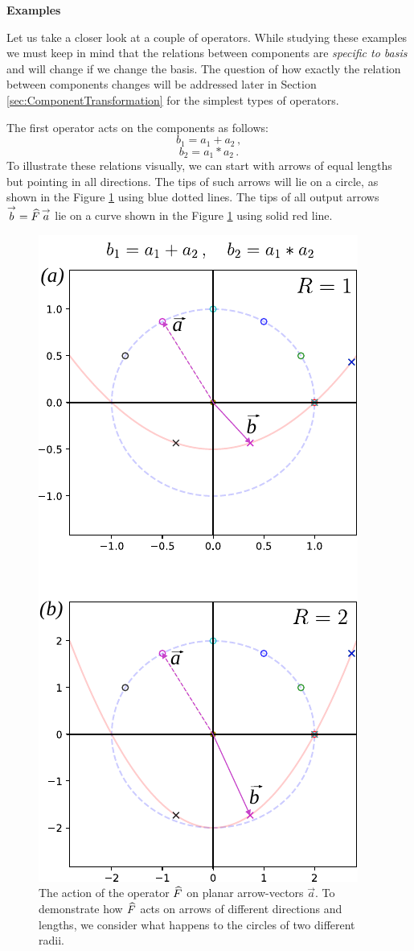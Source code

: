 \begin{flushleft}
  {\bf Examples}
\end{flushleft}
Let us take a closer look at a couple of operators. While studying
these examples we must keep in mind that the relations between
components are \emph{specific to basis} and will change if we change the
basis. The question of how exactly the relation between components
changes will be addressed later in Section
\ref{sec:ComponentTransformation} for the simplest types of operators.

The first operator acts on the components as follows:
\[
b_1 = a_1 + a_2\,,
\]
\[
b_2 = a_1 * a_2\,.
\]
To illustrate these relations visually, we can start with arrows of
equal lengths but pointing in all directions. The tips of such arrows
will lie on a circle, as shown in the Figure \ref{fig:operatorActionV1}
using blue dotted lines. The tips of all output arrows
$\overset{\rightarrow}{b}=\widehat{F}\,\overset{\rightarrow}{a}$ lie on a curve shown in
the Figure \ref{fig:operatorActionV1} using solid red line.
\begin{figure}[htbp]
  \centering
  \includegraphics[scale=1.0]{operatorAction_v1}
  \caption{The action of the operator $\widehat{F}$ on planar arrow-vectors
    $\vec{a}$. To demonstrate how $\widehat{F}$ acts on arrows of different
  directions and lengths, we consider what happens to the circles of
  two different radii.}
  \label{fig:operatorActionV1}
\end{figure}
